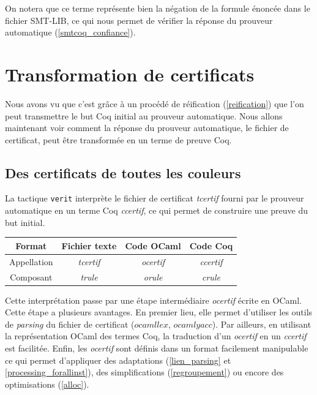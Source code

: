 \documentclass[11pt]{article}
\begin{document}
On notera que ce terme représente bien la négation de la formule énoncée dans le fichier SMT-LIB, ce qui nous permet de vérifier la réponse du prouveur automatique (\ref{smtcoq_confiance}). 



\section{Transformation de certificats} \label{transformation_certif}

Nous avons vu que c'est grâce à un procédé de réification (\ref{reification}) que l'on peut transmettre le but Coq initial au prouveur automatique. Nous allons maintenant voir comment la réponse du prouveur automatique, le fichier de certificat, peut être transformée en un terme de preuve Coq.

\subsection{Des certificats de toutes les couleurs} \label{des_certificats}

La tactique \texttt{verit} interprète le fichier de certificat \textit{tcertif} fourni par le prouveur automatique en un terme Coq \textit{ccertif}, ce qui permet de construire une preuve du but initial. 

\begin{center}
\begin{tabular}{ |c||c|c|c| } 
 \hline
 Format & Fichier texte & Code OCaml & Code Coq \\ 
 \hline
 Appellation & \textit{tcertif} & \textit{ocertif} & \textit{ccertif} \\ 
 \hline
 Composant & \textit{trule} & \textit{orule} & \textit{crule} \\ 
 \hline
\end{tabular}
\end{center}

Cette interprétation passe par une étape intermédiaire \textit{ocertif} écrite en OCaml. Cette étape a plusieurs avantages. En premier lieu, elle permet d'utiliser les outils de \textit{parsing} du fichier de certificat ($ocamllex$, $ocamlyacc$). Par ailleurs, en utilisant la représentation OCaml des termes Coq, la traduction d'un \textit{ocertif} en un \textit{ccertif} est facilitée. Enfin, les \textit{ocertif} sont définis dans un format facilement manipulable ce qui permet d'appliquer des adaptations (\ref{lien_parsing} et \ref{processing_forallinst}), des simplifications (\ref{regroupement}) ou encore des optimisations (\ref{alloc}).
\end{document}
